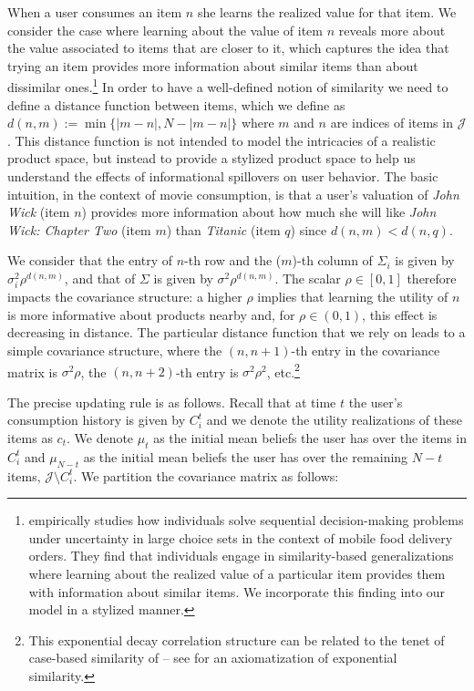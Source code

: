 \documentclass[manuscript]{acmart}
\newcommand{\xhdr}[1]{\vspace{1mm} \noindent{\bf #1}}
\begin{document}
\xhdr{User Learning.}
When a user consumes an item $n$ she learns the realized value for that item. We consider the case where  learning about the value of item $n$ reveals more about the value associated to items that are closer to it, which captures the idea that trying an item provides more information about similar items than about dissimilar ones.\footnote{\cite{schulz2019structured} empirically studies how individuals solve sequential decision-making problems under uncertainty in large choice sets in the context of mobile food delivery orders. They find that individuals engage in similarity-based generalizations where learning about the realized value of a particular item provides them with information about similar items. We incorporate this finding into our model in a stylized manner.} In order to have a well-defined notion of similarity we need to define a distance function between items, which we define as $d(n,m):=\min\{ \lvert m - n \rvert ,N - \lvert m - n \rvert \}$ where $m$ and $n$ are indices of items in $\mathcal{J}$. This distance function is not intended to model the intricacies of a realistic product space, but instead to provide a stylized product space to help us understand the effects of informational spillovers on user behavior. The basic intuition, in the context of movie consumption, is that a user's valuation of \textit{John Wick} (item $n$) provides more information about how much she will like \textit{John Wick: Chapter Two} (item $m$) than \textit{Titanic} (item $q$) since $d(n, m) < d(n, q)$. 
\par
We consider that the entry of $n$-th row and the ($m$)-th column of $\Sigma_i$ is given by $\sigma_i^2 \rho^{d(n,m)}$, and that of $\Sigma$ is given by $\sigma^2 \rho^{d(n,m)}$. The scalar $\rho \in [0,1]$ therefore impacts the covariance structure: a higher $\rho$ implies that learning the utility of $n$ is more informative about products nearby and, for $\rho \in (0,1)$, this effect is decreasing in distance. The particular distance function that we rely on leads to a simple covariance structure, where the $(n,n+1)$-th entry in the covariance matrix is $\sigma^{2} \rho$, the $(n,n+2)$-th entry is $\sigma^{2} \rho^2$, etc.\footnote{This exponential decay correlation structure can be related to the tenet of case-based similarity of \cite{gilboa1995case} -- see \cite{billot2008axiomatization} for an axiomatization of exponential similarity.}
\par
The precise updating rule is as follows. Recall that at time $t$ the user's consumption history is given by $C_{i}^{t}$ and we denote the utility realizations of these items as $c_t$. We denote $\mu_t$ as the initial mean beliefs the user has over the items in $C_{i}^{t}$ and $\mu_{N-t}$ as the initial mean beliefs the user has over the remaining $N-t$ items, $\mathcal{J} \setminus C_{i}^{t}$. We partition the covariance matrix as follows:
\end{document}
